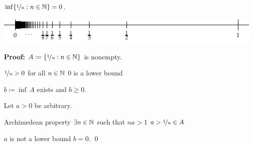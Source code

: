 \documentclass[10pt,aspectratio=169]{beamer}
\begin{document}
\begin{frame}

\begin{corollary}
$\inf \{ \nicefrac{1}{n} : n \in {\mathbb{N}} \} = 0$.
\end{corollary}

\pause

\begin{center}
\includegraphics{../figures/oneovernset.pdf}
\end{center}

\medskip
\pause

\textbf{Proof:}
$A \coloneqq \{ \nicefrac{1}{n} : n \in {\mathbb{N}} \}$ is nonempty.

\medskip
\pause

$\nicefrac{1}{n} > 0$ for all $n \in {\mathbb{N}}$ \wthus $0$ is a lower bound

\medskip
\pause

\thus \quad
$b \coloneqq \inf\, A$ exists and $b \geq 0$.

\medskip
\pause

Let $a > 0$ be arbitrary.

\medskip
\pause

Archimedean property \wthus $\exists n \in {\mathbb{N}}$ such that $na > 1$
\pause
\wthus
$a > \nicefrac{1}{n} \in A$

\medskip
\pause

\thus \quad $a$ is not a lower bound \pause \wthus $b=0$.
\qed

\end{frame}
\end{document}
